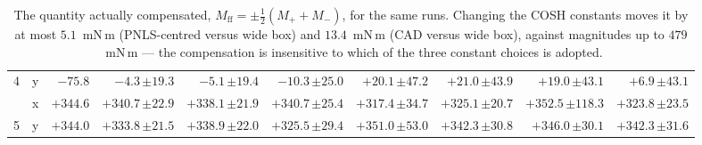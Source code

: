 \documentclass[10pt]{article}
\begin{document}
\begin{table}[t]
\begin{tabular}{cc r rrrrrrr}
4 & y & $-75.8$ & $-4.3\,{\scriptstyle\pm19.3}$ & $-5.1\,{\scriptstyle\pm19.4}$ & $-10.3\,{\scriptstyle\pm25.0}$ & $+20.1\,{\scriptstyle\pm47.2}$ & $+21.0\,{\scriptstyle\pm43.9}$ & $+19.0\,{\scriptstyle\pm43.1}$ & $+6.9\,{\scriptstyle\pm43.1}$ \\
\addlinespace[2pt]
5 & x & $+344.6$ & $+340.7\,{\scriptstyle\pm22.9}$ & $+338.1\,{\scriptstyle\pm21.9}$ & $+340.7\,{\scriptstyle\pm25.4}$ & $+317.4\,{\scriptstyle\pm34.7}$ & $+325.1\,{\scriptstyle\pm20.7}$ & $+352.5\,{\scriptstyle\pm118.3}$ & $+323.8\,{\scriptstyle\pm23.5}$ \\
5 & y & $+344.0$ & $+333.8\,{\scriptstyle\pm21.5}$ & $+338.9\,{\scriptstyle\pm22.0}$ & $+325.5\,{\scriptstyle\pm29.4}$ & $+351.0\,{\scriptstyle\pm53.0}$ & $+342.3\,{\scriptstyle\pm30.8}$ & $+346.0\,{\scriptstyle\pm30.1}$ & $+342.3\,{\scriptstyle\pm31.6}$ \\
\bottomrule
\end{tabular}
\caption{The quantity actually compensated,
$M_{\mathrm{ff}} = \pm\tfrac12(M_+ + M_-)$, for the same runs. Changing
the COSH constants moves it by at most $5.1$~mN\,m (PNLS-centred versus
wide box) and $13.4$~mN\,m (CAD versus wide box), against magnitudes up
to $479$~mN\,m --- the compensation is insensitive to which of the three
constant choices is adopted.}
\label{tab:mff}
\end{table}
\end{document}

